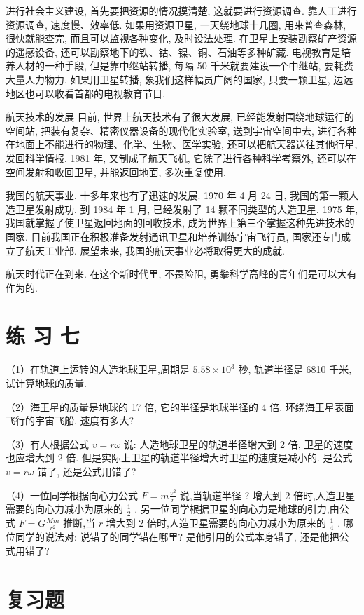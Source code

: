 \documentclass[10pt]{article}
\begin{document}
进行社会主义建设, 首先要把资源的情况摸清楚, 这就要进行资源调查. 靠人工进行资源调查, 速度慢、效率低. 如果用资源卫星, 一天绕地球十几圈, 用来普查森林, 很快就能查完, 而且可以监视各种变化, 及时设法处理. 在卫星上安装勘察矿产资源的遥感设备, 还可以勘察地下的铁、钴、镍、铜、石油等多种矿藏. 电视教育是培养人材的一种手段, 但是靠中继站转播, 每隔 50 千米就要建设一个中继站, 要耗费大量人力物力. 如果用卫星转播, 象我们这样幅员广阔的国家, 只要一颗卫星, 边远地区也可以收看首都的电视教育节目.

航天技术的发展 目前, 世界上航天技术有了很大发展, 已经能发射围绕地球运行的空间站, 把装有复杂、精密仪器设备的现代化实验室, 送到宇宙空间中去, 进行各种在地面上不能进行的物理、化学、生物、医学实验, 还可以把航天器送往其他行星, 发回科学情报. 1981 年, 又制成了航天飞机, 它除了进行各种科学考察外, 还可以在空间发射和收回卫星, 并能返回地面, 多次重复使用.

我国的航天事业, 十多年来也有了迅速的发展. 1970 年 4 月 24 日, 我国的第一颗人造卫星发射成功, 到 1984 年 1 月, 已经发射了 14 颗不同类型的人造卫星. 1975 年, 我国就掌握了使卫星返回地面的回收技术, 成为世界上第三个掌握这种先进技术的国家. 目前我国正在积极准备发射通讯卫星和培养训练宇宙飞行员, 国家还专门成立了航天工业部. 展望未来, 我国的航天事业必将取得更大的成就.

航天时代正在到来. 在这个新时代里, 不畏险阻, 勇攀科学高峰的青年们是可以大有作为的.

\section*{练 习 七}

（1）在轨道上运转的人造地球卫星,周期是 \({5.58} \times {10}^{3}\) 秒, 轨道半径是 6810 千米, 试计算地球的质量.

（2）海王星的质量是地球的 17 倍, 它的半径是地球半径的 4 倍. 环绕海王星表面飞行的宇宙飞船, 速度有多大?

（3）有人根据公式 \(v = {r\omega }\) 说: 人造地球卫星的轨道半径增大到 2 倍, 卫星的速度也应增大到 2 倍. 但是实际上卫星的轨道半径增大时卫星的速度是减小的. 是公式 \(v = {r\omega }\) 错了, 还是公式用错了?

（4）一位同学根据向心力公式 \(F = m\frac{{v}^{2}}{r}\) 说,当轨道半径 ? 增大到 2 倍时,人造卫星需要的向心力减小为原来的 \(\frac{1}{2}\) . 另一位同学根据卫星的向心力是地球的引力,由公式 \(F = G\frac{Mm}{{r}^{2}}\) 推断,当 \(r\) 增大到 2 倍时,人造卫星需要的向心力减小为原来的 \(\frac{1}{4}\) . 哪位同学的说法对: 说错了的同学错在哪里? 是他引用的公式本身错了, 还是他把公式用错了?

\section*{复习题}
\end{document}
